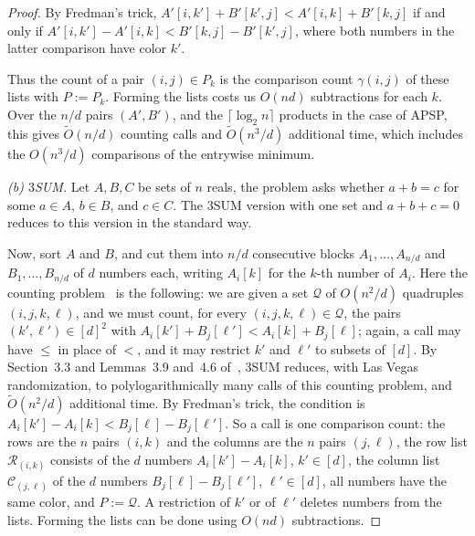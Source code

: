 \begin{proof}
By Fredman's trick, $A'[i,k']+B'[k',j]<A'[i,k]+B'[k,j]$ if and only if $A'[i,k']-A'[i,k]<B'[k,j]-B'[k',j]$, where both numbers in the latter comparison have color $k'$.

Thus the count of a pair $(i,j)\in P_k$ is the comparison count $\gamma(i,j)$ of these lists with $P:=P_k$. Forming the lists costs us $O(nd)$ subtractions for each $k$. Over the $n/d$ pairs $(A',B')$, and the $\lceil\log_2n\rceil$ products in the case of APSP, this gives $\tilde{O}(n/d)$ counting calls and $\tilde{O}(n^3/d)$ additional time, which includes the $O(n^3/d)$ comparisons of the entrywise minimum.

\emph{(b) $3$SUM.} Let $A,B,C$ be sets of $n$ reals, the problem asks whether $a+b=c$ for some $a\in A$, $b\in B$, and $c\in C$. The $3$SUM version with one set and $a+b+c=0$ reduces to this version in the standard way.

Now, sort $A$ and $B$, and cut them into $n/d$ consecutive blocks $A_1,\dots,A_{n/d}$ and $B_1,\dots,B_{n/d}$ of $d$ numbers each, writing $A_i[k]$ for the $k$-th number of $A_i$. Here the counting problem~\cite[Problem~4.5]{CVX22} is the following: we are given a set $\mathcal Q$ of $O(n^2/d)$ quadruples $(i,j,k,\ell)$, and we must count, for every $(i,j,k,\ell)\in\mathcal Q$, the pairs $(k',\ell')\in[d]^2$ with $A_i[k']+B_j[\ell']<A_i[k]+B_j[\ell]$; again, a call may have $\le$ in place of $<$, and it may restrict $k'$ and $\ell'$ to subsets of $[d]$. By Section~3.3 and Lemmas~3.9 and~4.6 of~\cite{CVX22}, $3$SUM reduces, with Las Vegas randomization, to polylogarithmically many calls of this counting problem, and $\tilde{O}(n^2/d)$ additional time. By Fredman's trick, the condition is $A_i[k']-A_i[k]<B_j[\ell]-B_j[\ell']$. So a call is one comparison count: the rows are the $n$ pairs $(i,k)$ and the columns are the $n$ pairs $(j,\ell)$, the row list $\mathcal R_{(i,k)}$ consists of the $d$ numbers $A_i[k']-A_i[k]$, $k'\in[d]$, the column list $\mathcal C_{(j,\ell)}$ of the $d$ numbers $B_j[\ell]-B_j[\ell']$, $\ell'\in[d]$, all numbers have the same color, and $P:=\mathcal Q$. A restriction of $k'$ or of $\ell'$ deletes numbers from the lists. Forming the lists can be done using $O(nd)$ subtractions.
\end{proof}

